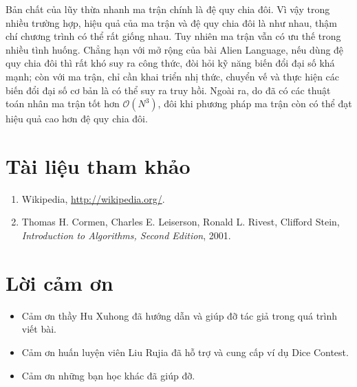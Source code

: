 \documentclass[11pt]{article}
\newcommand{\Oh}{\mathcal{O}}
\begin{document}
Bản chất của lũy thừa nhanh ma trận chính là đệ quy chia đôi. Vì vậy trong
nhiều trường hợp, hiệu quả của ma trận và đệ quy chia đôi là như nhau, thậm
chí chương trình có thể rất giống nhau. Tuy nhiên ma trận vẫn có ưu thế trong
nhiều tình huống. Chẳng hạn với mở rộng của bài Alien Language, nếu dùng đệ
quy chia đôi thì rất khó suy ra công thức, đòi hỏi kỹ năng biến đổi đại số
khá mạnh; còn với ma trận, chỉ cần khai triển nhị thức, chuyển vế và thực hiện
các biến đổi đại số cơ bản là có thể suy ra truy hồi. Ngoài ra, do đã có các
thuật toán nhân ma trận tốt hơn \(\Oh(N^3)\), đôi khi phương pháp ma trận còn
có thể đạt hiệu quả cao hơn đệ quy chia đôi.

\section*{Tài liệu tham khảo}

\begin{enumerate}
  \item Wikipedia, \url{http://wikipedia.org/}.
  \item Thomas H. Cormen, Charles E. Leiserson, Ronald L. Rivest, Clifford
  Stein, \textit{Introduction to Algorithms, Second Edition}, 2001.
\end{enumerate}

\section*{Lời cảm ơn}

\begin{itemize}
  \item Cảm ơn thầy Hu Xuhong đã hướng dẫn và giúp đỡ tác giả trong quá trình
  viết bài.
  \item Cảm ơn huấn luyện viên Liu Rujia đã hỗ trợ và cung cấp ví dụ Dice
  Contest.
  \item Cảm ơn những bạn học khác đã giúp đỡ.
\end{itemize}
\end{document}

